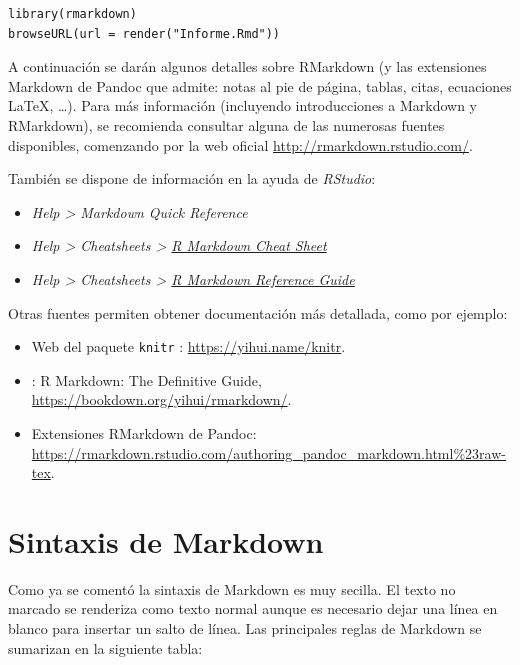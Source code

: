 \documentclass[]{book}
\theoremstyle{definition}
\theoremstyle{definition}
\theoremstyle{definition}
\theoremstyle{remark}
\begin{document}
\begin{verbatim}
library(rmarkdown)
browseURL(url = render("Informe.Rmd"))
\end{verbatim}

A continuación se darán algunos detalles sobre RMarkdown (y las
extensiones Markdown de Pandoc que admite: notas al pie de página,
tablas, citas, ecuaciones LaTeX, \ldots{}). Para más información
(incluyendo introducciones a Markdown y RMarkdown), se recomienda
consultar alguna de las numerosas fuentes disponibles, comenzando por la
web oficial \url{http://rmarkdown.rstudio.com/}.

También se dispone de información en la ayuda de \emph{RStudio}:

\begin{itemize}
\item
  \emph{Help \textgreater{} Markdown Quick Reference}
\item
  \emph{Help \textgreater{} Cheatsheets \textgreater{}
  \href{https://www.rstudio.org/links/r_markdown_cheat_sheet}{R Markdown
  Cheat Sheet}}
\item
  \emph{Help \textgreater{} Cheatsheets \textgreater{}
  \href{https://www.rstudio.com/wp-content/uploads/2015/03/rmarkdown-reference.pdf}{R
  Markdown Reference Guide}}
\end{itemize}

Otras fuentes permiten obtener documentación más detallada, como por
ejemplo:

\begin{itemize}
\item
  Web del paquete \texttt{knitr} \citep{R-knitr}:
  \url{https://yihui.name/knitr}.
\item
  \citet{xie2018r} : R Markdown: The Definitive Guide,
  \url{https://bookdown.org/yihui/rmarkdown/}.
\item
  Extensiones RMarkdown de Pandoc:
  \url{https://rmarkdown.rstudio.com/authoring_pandoc_markdown.html\%23raw-tex}.
\end{itemize}

\section{Sintaxis de Markdown}\label{markdown}

Como ya se comentó la sintaxis de Markdown es muy secilla. El texto no
marcado se renderiza como texto normal aunque es necesario dejar una
línea en blanco para insertar un salto de línea. Las principales reglas
de Markdown se sumarizan en la siguiente tabla:
\end{document}
